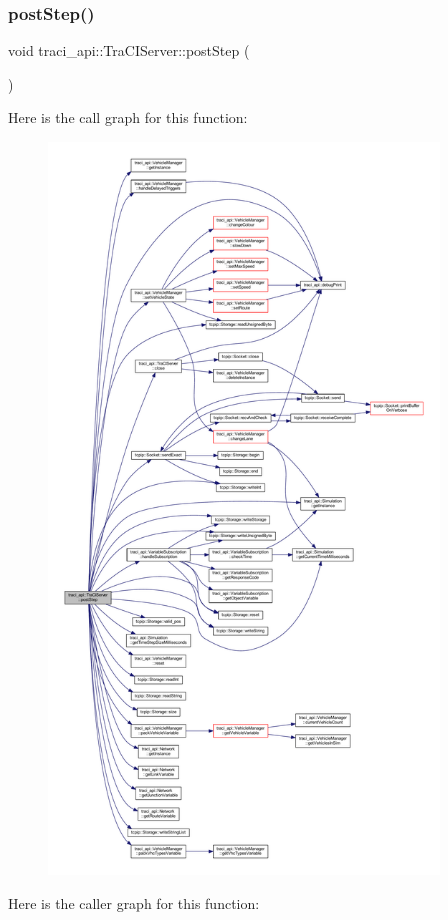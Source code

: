 \subsubsection{\texorpdfstring{post\+Step()}{postStep()}}
{\footnotesize\ttfamily void traci\+\_\+api\+::\+Tra\+C\+I\+Server\+::post\+Step (\begin{DoxyParamCaption}{ }\end{DoxyParamCaption})}

Here is the call graph for this function\+:\nopagebreak
\begin{figure}[H]
\begin{center}
\leavevmode
\includegraphics[height=550pt]{classtraci__api_1_1_tra_c_i_server_af4814a9a99d79f4e00fc102169d10cc2_cgraph}
\end{center}
\end{figure}
Here is the caller graph for this function\+:\nopagebreak
